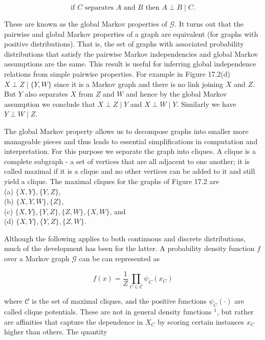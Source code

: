\documentclass[10pt]{article}
\begin{document}
\begin{equation*}
\text { if } C \text { separates } A \text { and } B \text { then } A \perp B \mid C \text {. } \tag{17.2}
\end{equation*}


These are known as the global Markov properties of $\mathcal{G}$. It turns out that the pairwise and global Markov properties of a graph are equivalent (for graphs with positive distributions). That is, the set of graphs with associated probability distributions that satisfy the pairwise Markov independencies and global Markov assumptions are the same. This result is useful for inferring global independence relations from simple pairwise properties. For example in Figure 17.2(d) $X \perp Z \mid\{Y, W\}$ since it is a Markov graph and there is no link joining $X$ and $Z$. But $Y$ also separates $X$ from $Z$ and $W$ and hence by the global Markov assumption we conclude that $X \perp Z \mid Y$ and $X \perp W \mid Y$. Similarly we have $Y \perp W \mid Z$.

The global Markov property allows us to decompose graphs into smaller more manageable pieces and thus leads to essential simplifications in computation and interpretation. For this purpose we separate the graph into cliques. A clique is a complete subgraph - a set of vertices that are all adjacent to one another; it is called maximal if it is a clique and no other vertices can be added to it and still yield a clique. The maximal cliques for the graphs of Figure 17.2 are\\
(a) $\{X, Y\},\{Y, Z\}$,\\
(b) $\{X, Y, W\},\{Z\}$,\\
(c) $\{X, Y\},\{Y, Z\},\{Z, W\},\{X, W\}$, and\\
(d) $\{X, Y\},\{Y, Z\},\{Z, W\}$.

Although the following applies to both continuous and discrete distributions, much of the development has been for the latter. A probability density function $f$ over a Markov graph $\mathcal{G}$ can be can represented as


\begin{equation*}
f(x)=\frac{1}{Z} \prod_{C \in \mathcal{C}} \psi_{C}\left(x_{C}\right) \tag{17.3}
\end{equation*}


where $\mathcal{C}$ is the set of maximal cliques, and the positive functions $\psi_{C}(\cdot)$ are called clique potentials. These are not in general density functions ${ }^{1}$, but rather are affinities that capture the dependence in $X_{C}$ by scoring certain instances $x_{C}$ higher than others. The quantity
\end{document}
